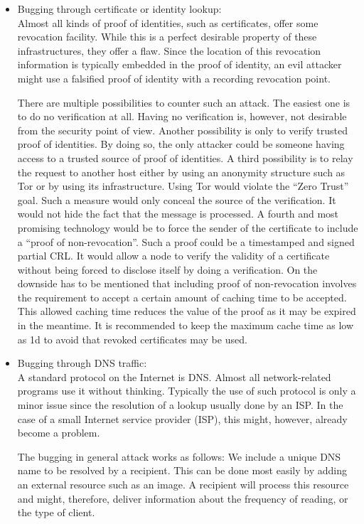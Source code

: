 \begin{itemize}
	\item Bugging through certificate or identity lookup:\\
	Almost all kinds of proof of identities, such as certificates, offer some revocation facility. While this is a perfect desirable property of these infrastructures, they offer a flaw. Since the location of this revocation information is typically embedded in the proof of identity, an evil attacker might use a falsified proof of identity with a recording revocation point.
	
	There are multiple possibilities to counter such an attack. The easiest one is to do no verification at all. Having no verification is, however, not desirable from the security point of view. Another possibility is only to verify trusted proof of identities. By doing so, the only attacker could be someone having access to a trusted source of proof of identities. A third possibility is to relay the request to another host either by using an anonymity structure such as Tor or by using its infrastructure. Using Tor would violate the ``Zero Trust'' goal. Such a measure would only conceal the source of the verification. It would not hide the fact that the message is processed. A fourth and most promising technology would be to force the sender of the certificate to include a ``proof of non-revocation''. Such a proof could be a timestamped and signed partial CRL. It would allow a node to verify the validity of a certificate without being forced to disclose itself by doing a verification. On the downside has to be mentioned that including proof of non-revocation involves the requirement to accept a certain amount of caching time to be accepted. This allowed caching time reduces the value of the proof as it may be expired in the meantime. It is recommended to keep the maximum cache time as low as 1d to avoid that revoked certificates may be used. 
	
	\item Bugging through DNS traffic:\\
	A standard protocol on the Internet is DNS. Almost all network-related programs use it without thinking. Typically the use of such protocol is only a minor issue since the resolution of a lookup usually done by an ISP. In the case of a small Internet service provider (ISP), this might, however, already become a problem.
	
	The bugging in general attack works as follows: We include a unique DNS name to be resolved by a recipient. This can be done most easily by adding an external resource such as an image. A recipient will process this resource and might, therefore, deliver information about the frequency of reading, or the type of client. 
	

\end{itemize}
